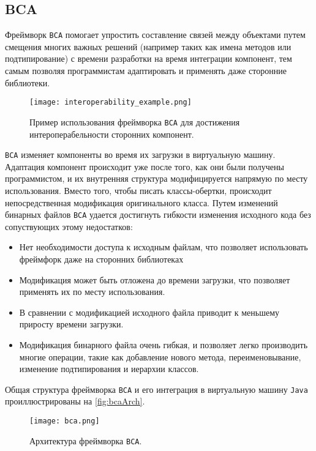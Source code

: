 \subsection{BCA}

Фреймворк \texttt{BCA} помогает упростить составление связей между объектами путем смещения многих важных решений (например таких как имена методов или подтипирование) с времени разработки на время интеграции компонент, тем самым позволяя программистам адаптировать и применять даже сторонние библиотеки. 

\begin{figure}[h]
\centering
\texttt{[image: interoperability\_example.png]}
\caption{Пример использования фреймворка \texttt{BCA} для достижения интероперабельности сторонних компонент.}
\label{fig:interopExample}
\end{figure}

\texttt{BCA} изменяет компоненты во время их загрузки в виртуальную машину. Адаптация компонент происходит уже после того, как они были получены программистом, и их внутренняя структура модифицируется напрямую по месту использования. Вместо того, чтобы писать классы-обертки, происходит непосредственная модификация оригинального класса. Путем изменений бинарных файлов \texttt{BCA} удается достигнуть гибкости изменения исходного кода без сопуствующих этому недостатков:

\begin{itemize}
    \item Нет необходимости доступа к исходным файлам, что позволяет использовать фреймфорк даже на сторонних библиотеках
    \item Модификация может быть отложена до времени загрузки, что позволяет применять их по месту использования.
    \item В сравнении с модификацией исходного файла приводит к меньшему приросту времени загрузки.
    \item Модификация бинарного файла очень гибкая, и позволяет легко производить многие операции, такие как добавление нового метода, переименовывание, изменение подтипирования и иерархии классов.
\end{itemize}

Общая структура фреймворка \texttt{BCA} и его интеграция в виртуальную машину \texttt{Java} проиллюстрированы на \autoref{fig:bcaArch}.

\begin{figure}[h]
\centering
\texttt{[image: bca.png]}
\caption{Архитектура фреймворка \texttt{BCA}.}
\label{fig:bcaArch}
\end{figure}

